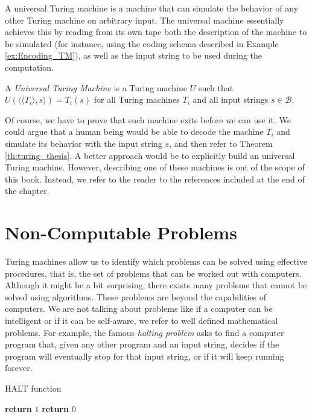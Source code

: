 A universal Turing machine is a machine that can simulate the behavior of any other Turing machine on arbitrary input. The universal machine essentially achieves this by reading from its own tape both the description of the machine to be simulated (for instance, using the coding schema described in Example \ref{ex:Encoding_TM}), as well as the input string to be used during the computation.

\begin{definition}
\label{def:Universal-Turing-Machine}
A \emph{Universal Turing Machine} is a Turing machine $U$ such that $U(\langle \langle T_i\rangle, s \rangle) = T_i(s)$ for all Turing machines $T_i$ and all input strings $s \in \mathcal{B}$.
\end{definition}

Of course, we have to prove that such machine exits before we can use it. We could argue that a human being would be able to decode the machine $T_i$ and simulate its behavior with the input string $s$, and then refer to Theorem \ref{th:turing_thesis}. A better approach would be to explicitly build an universal Turing machine. However, describing one of these machines is out of the scope of this book. Instead, we refer to the reader to the references included at the end of the chapter.

%
%

\section{Non-Computable Problems}
\label{sec:non_computable_problems}

Turing machines allow us to identify which problems can be solved using effective procedures, that is, the set of problems that can be worked out with computers. Although it might be a bit surprising, there exists many problems that cannot be solved using algorithms. These problems are beyond the capabilities of computers. We are not talking about problems like if a computer can be intelligent or if it can be self-aware, we refer to well defined mathematical problems. For example, the famous \emph{halting problem} asks to find a computer program that, given any other program and an input string, decides if the program will eventually stop for that input string, or if it will keep running forever.

\begin{algorithm}
\caption{HALT function}
\label{alg:halt}
\begin{algorithmic}
        \State \textbf{return} $1$
    \Else
        \State \textbf{return} $0$
    \EndIf
\EndProcedure
\end{algorithmic}
\end{algorithm}

